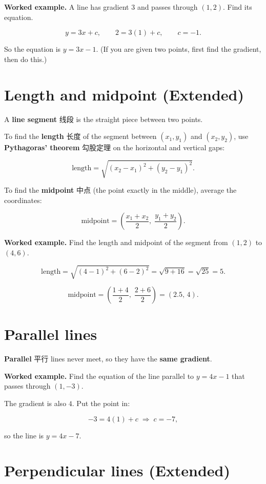 \documentclass[11pt]{article}
\begin{document}
\textbf{Worked example.} A line has gradient $3$ and passes through $(1, 2)$. Find its equation.

\[
y = 3x + c, \qquad 2 = 3(1) + c, \qquad c = -1.
\]

So the equation is $y = 3x - 1$. (If you are given two points, first find the gradient, then do this.)

\section*{Length and midpoint (Extended)}

A \textbf{line segment} 线段 is the straight piece between two points.

To find the \textbf{length} 长度 of the segment between $(x_1, y_1)$ and $(x_2, y_2)$, use \textbf{Pythagoras' theorem} 勾股定理 on the horizontal and vertical gaps:

\[
\text{length} = \sqrt{(x_2 - x_1)^2 + (y_2 - y_1)^2}.
\]

To find the \textbf{midpoint} 中点 (the point exactly in the middle), average the coordinates:

\[
\text{midpoint} = \left( \frac{x_1 + x_2}{2}, \; \frac{y_1 + y_2}{2} \right).
\]

\textbf{Worked example.} Find the length and midpoint of the segment from $(1, 2)$ to $(4, 6)$.

\[
\text{length} = \sqrt{(4 - 1)^2 + (6 - 2)^2} = \sqrt{9 + 16} = \sqrt{25} = 5.
\]

\[
\text{midpoint} = \left( \frac{1 + 4}{2}, \; \frac{2 + 6}{2} \right) = (2.5, \, 4).
\]

\section*{Parallel lines}

\textbf{Parallel} 平行 lines never meet, so they have the \textbf{same gradient}.

\textbf{Worked example.} Find the equation of the line parallel to $y = 4x - 1$ that passes through $(1, -3)$.

The gradient is also $4$. Put the point in:

\[
-3 = 4(1) + c \;\Rightarrow\; c = -7,
\]

so the line is $y = 4x - 7$.

\section*{Perpendicular lines (Extended)}
\end{document}
